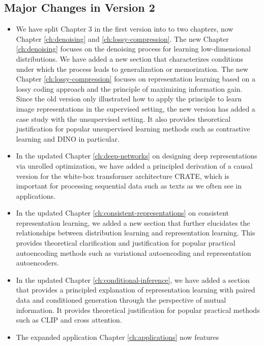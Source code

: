 \documentclass[../../book-main.tex]{subfiles}
\begin{document}
\subsection*{Major Changes in Version 2}
\begin{itemize}
    \item We have split Chapter 3 in the first version into to two chapters, now
        Chapter \ref{ch:denoising} and \ref{ch:lossy-compression}. The new
        Chapter \ref{ch:denoising} focuses on the denoising process for learning
        low-dimensional distributions. We have added a new section that
        characterizes conditions under which the process leads to generalization
        or memorization. The new Chapter \ref{ch:lossy-compression} focuses on
        representation learning based on a lossy coding approach and the
        principle of maximizing information gain. Since the old version only
        illustrated how to apply the principle to learn image representations in
        the supervised setting, the new version has added a case study with the
        unsupervised setting. It also provides theoretical justification for
        popular unsupervised learning methods such as contrastive learning and DINO in particular.
    \item In the updated Chapter \ref{ch:deep-networks} on designing deep representations via unrolled optimization, we have added a principled  derivation of a causal version for the white-box transformer architecture CRATE, which is important for processing sequential data such as texts as we often see in applications.
    \item In the updated Chapter \ref{ch:consistent-representations} on consistent
        representation learning, we added a new section that further elucidates
        the relationships between distribution learning and representation
        learning. This provides theoretical clarification and justification for
        popular practical autoencoding methods such as variational autoencoding
        and representation autoencoders.
    \item In the updated Chapter \ref{ch:conditional-inference}, we have added
        a section that provides a principled explanation of representation
        learning with paired data and conditioned generation through the
        perspective of mutual information. It provides theoretical justification
        for popular practical methods such as CLIP and cross attention.
    \item The expanded application Chapter \ref{ch:applications} now features

\end{itemize}
\end{document}
